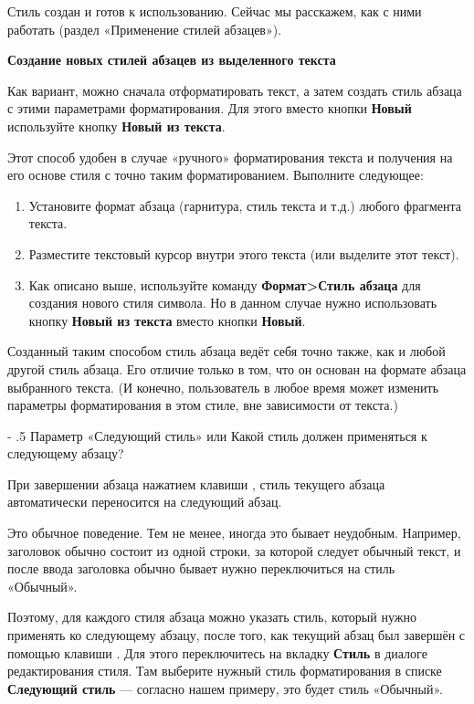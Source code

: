 \documentclass[a4paper,10pt]{article}
\makeatletter
\renewcommand\paragraph{%
   \@startsection{paragraph}{4}{0mm}%
      {-\baselineskip}%
      {.5\baselineskip}%
      {\normalfont\normalsize\bfseries}}
\makeatother
\begin{document}
Стиль создан и готов к использованию. Сейчас мы расскажем, как с ними работать (раздел «Применение стилей абзацев»).

\textbf{Создание новых стилей абзацев из выделенного текста}

Как вариант, можно сначала отформатировать текст, а затем создать стиль абзаца с этими параметрами форматирования. Для этого вместо кнопки \textbf{Новый} используйте кнопку \textbf{Новый из текста}.

Этот способ удобен в случае «ручного» форматирования текста и получения на его основе стиля с точно таким форматированием.
Выполните следующее:
\begin{enumerate}
 \item Установите формат абзаца (гарнитура, стиль текста и т.д.) любого фрагмента текста.
 \item Разместите текстовый курсор внутри этого текста (или выделите этот текст).
 \item Как описано выше, используйте команду \textbf{Формат>Стиль абзаца} для создания нового стиля символа. Но в данном случае нужно использовать кнопку \textbf{Новый из текста} вместо кнопки \textbf{Новый}.
\end{enumerate}

Созданный таким способом стиль абзаца ведёт себя точно также, как и любой другой стиль абзаца. Его отличие только в том, что он основан на формате абзаца выбранного текста. (И конечно, пользователь в любое время может изменить параметры форматирования в этом стиле, вне зависимости от текста.)

\paragraph{Параметр «Следующий стиль» или Какой стиль должен применяться к следующему абзацу?} 

При завершении абзаца нажатием клавиши , стиль текущего абзаца автоматически переносится на следующий абзац.

Это обычное поведение. Тем не менее, иногда это бывает неудобным. Например, заголовок обычно состоит из одной строки, за которой следует обычный текст, и после ввода заголовка обычно бывает нужно переключиться на стиль «Обычный».

Поэтому, для каждого стиля абзаца можно указать стиль, который нужно применять ко следующему абзацу, после того, как текущий абзац был завершён с помощью клавиши . Для этого переключитесь на вкладку \textbf{Стиль} в диалоге редактирования стиля. Там выберите нужный стиль форматирования в списке \textbf{Следующий стиль} --- согласно нашем примеру, это будет стиль «Обычный».
\end{document}
